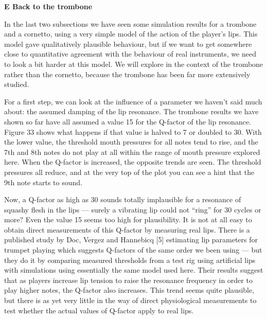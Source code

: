 

  \textbf{E Back to the trombone} 

  In the last two subsections we have seen some simulation results for a 
  trombone and a cornetto, using a very simple model of the action of the 
  player’s lips. This model gave qualitatively plausible behaviour, but if we 
  want to get somewhere close to quantitative agreement with the behaviour of 
  real instruments, we need to look a bit harder at this model. We will explore 
  in the context of the trombone rather than the cornetto, because the trombone 
  has been far more extensively studied. 

  For a first step, we can look at the influence of a parameter we haven’t said 
  much about: the assumed damping of the lip resonance. The trombone results we 
  have shown so far have all assumed a value 15 for the Q-factor of the lip 
  resonance. Figure 33 shows what happens if that value is halved to 7 or 
  doubled to 30. With the lower value, the threshold mouth pressures for all 
  notes tend to rise, and the 7th and 8th notes do not play at all within the 
  range of mouth pressure explored here. When the Q-factor is increased, the 
  opposite trends are seen. The threshold pressures all reduce, and at the very 
  top of the plot you can see a hint that the 9th note starts to sound. 



  Now, a Q-factor as high as 30 sounds totally implausible for a resonance of 
  squashy flesh in the lips --- surely a vibrating lip could not ``ring'' for 
  30 cycles or more? Even the value 15 seems too high for plausibility. It is 
  not at all easy to obtain direct measurements of this Q-factor by measuring 
  real lips. There is a published study by Doc, Vergez and Hannebicq [5] 
  estimating lip parameters for trumpet playing which suggests Q-factors of the 
  same order we been using — but they do it by comparing measured thresholds 
  from a test rig using artificial lips with simulations using essentially the 
  same model used here. Their results suggest that as players increase lip 
  tension to raise the resonance frequency in order to play higher notes, the 
  Q-factor also increases. This trend seems quite plausible, but there is as 
  yet very little in the way of direct physiological measurements to test 
  whether the actual values of Q-factor apply to real lips. 

